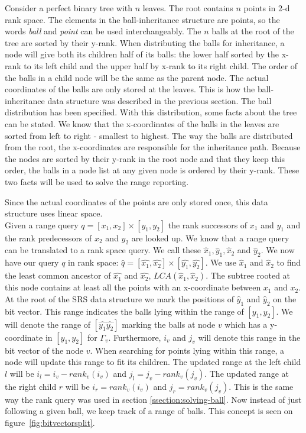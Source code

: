 Consider a perfect binary tree with $n$ leaves. The root contains $n$ points in $2$-d rank space. The elements in the ball-inheritance structure are points, so the words \emph{ball} and \emph{point} can be used interchangeably. The $n$ balls at the root of the tree are sorted by their y-rank. When distributing the balls for inheritance, a node will give both its children half of its balls: the lower half sorted by the x-rank to its left child and the upper half by x-rank to its right child. The order of the balls in a child node will be the same as the parent node. The actual coordinates of the balls are only stored at the leaves. This is how the ball-inheritance data structure was described in the previous section. The ball distribution has been specified. With this distribution, some facts about the tree can be stated. We know that the x-coordinates of the balls in the leaves are sorted from left to right - smallest to highest. The way the balls are distributed from the root, the x-coordinates are responsible for the inheritance path.  Because the nodes are sorted by their y-rank in the root node and that they keep this order, the balls in a node list at any given node is ordered by their y-rank. These two facts will be used to solve the range reporting.

\noindent Since the actual coordinates of the points are only stored once, this data structure uses linear space. \\

Given a range query $q = [x_1, x_2] \times [y_1, y_2]$ the rank successors of $x_1$ and $y_1$ and the rank predecessors of $x_2$ and $y_2$ are looked up. We know that a range query can be translated to a rank space query. We call these $\hat{x}_1, \hat{y}_1, \hat{x}_2$ and $\hat{y}_2$. We now have our query $q$ in rank space: $\hat{q} = [\hat{x_1}, \hat{x_2}] \times [\hat{y_1}, \hat{y_2}]$. We use $\hat{x}_1$ and $\hat{x}_2$ to find the least common ancestor of $\hat{x_1}$ and $\hat{x_2}$, $LCA(\hat{x}_1, \hat{x}_2)$. The subtree rooted at this node contains at least all the points with an x-coordinate between $x_1$ and $x_2$. \\

At the root of the SRS data structure we mark the positions of $\hat{y}_1$ and $\hat{y}_2$ on the bit vector. This range indicates the balls lying within the range of $[y_1, y_2]$. We will denote the range of $[\hat{y_1} \hat{y_2}]$ marking the balls at node $v$ which has a y-coordinate in $[y_1, y_2]$ for $ \Gamma_v$. Furthermore, $i_v$ and $j_v$ will denote this range in the bit vector of the node $v$. When searching for points lying within this range, a node will update this range to fit its children. The updated range at the left child $l$ will be $i_l = i_v - rank_v(i_v)$ and $j_l = j_v - rank_v(j_v)$. The updated range at the right child $r$ will be $i_r = rank_v(i_v)$ and $j_r = rank_v(j_v)$. This is the same way the rank query was used in section \ref{ssection:solving-ball}. Now instead of just following a given ball, we keep track of a range of balls. This concept is seen on figure~\ref{fig:bitvectorsplit}. \\


